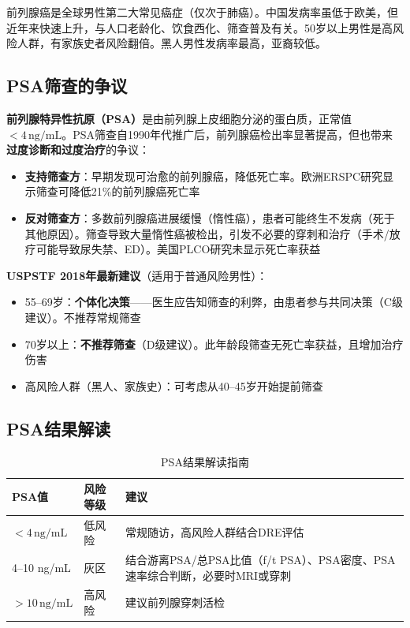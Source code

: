 前列腺癌是全球男性第二大常见癌症（仅次于肺癌）。中国发病率虽低于欧美，但近年来快速上升，与人口老龄化、饮食西化、筛查普及有关。50岁以上男性是高风险人群，有家族史者风险翻倍。黑人男性发病率最高，亚裔较低。

\subsection{PSA筛查的争议}

\textbf{前列腺特异性抗原（PSA）}是由前列腺上皮细胞分泌的蛋白质，正常值$<4\,\mathrm{ng/mL}$。PSA筛查自1990年代推广后，前列腺癌检出率显著提高，但也带来\textbf{过度诊断和过度治疗}的争议：

\begin{itemize}[leftmargin=2cm]
	\item \textbf{支持筛查方}：早期发现可治愈的前列腺癌，降低死亡率。欧洲ERSPC研究显示筛查可降低21\%的前列腺癌死亡率
	\item \textbf{反对筛查方}：多数前列腺癌进展缓慢（惰性癌），患者可能终生不发病（死于其他原因）。筛查导致大量惰性癌被检出，引发不必要的穿刺和治疗（手术/放疗可能导致尿失禁、ED）。美国PLCO研究未显示死亡率获益
\end{itemize}

\textbf{USPSTF 2018年最新建议}（适用于普通风险男性）：
\begin{itemize}[leftmargin=2cm]
	\item 55--69岁：\textbf{个体化决策}——医生应告知筛查的利弊，由患者参与共同决策（C级建议）。不推荐常规筛查
	\item 70岁以上：\textbf{不推荐筛查}（D级建议）。此年龄段筛查无死亡率获益，且增加治疗伤害
	\item 高风险人群（黑人、家族史）：可考虑从40--45岁开始提前筛查
\end{itemize}

\subsection{PSA结果解读}

\begin{table}[htbp]
\centering
\caption{PSA结果解读指南}
\label{tab:psa_interpretation}
\begin{tabularx}{\textwidth}{@{}llX@{}}
    \toprule
    \textbf{PSA值} & \textbf{风险等级} & \textbf{建议} \\
    \midrule
    $<4\,\mathrm{ng/mL}$ & 低风险 & 常规随访，高风险人群结合DRE评估 \\
    4--10 ng/mL & 灰区 & 结合游离PSA/总PSA比值（f/t PSA）、PSA密度、PSA速率综合判断，必要时MRI或穿刺 \\
    $>10\,\mathrm{ng/mL}$ & 高风险 & 建议前列腺穿刺活检 \\
    \bottomrule
\end{tabularx}
\end{table}

